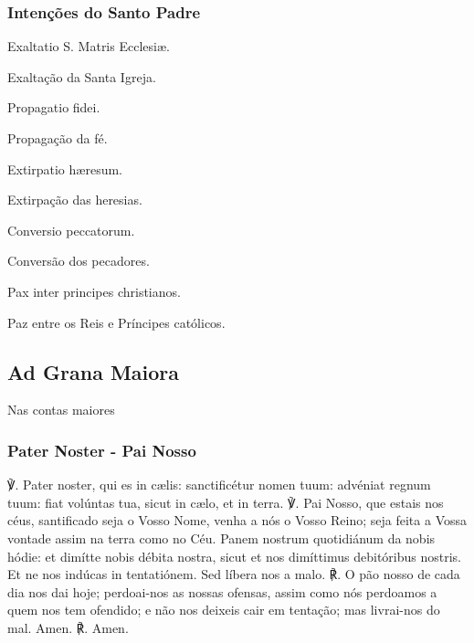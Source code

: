 \subsubsection{Intenções do Santo Padre}
\begin{paracol}{2}
\begin{compactitem}
\item Exaltatio S. Matris Ecclesiæ.
\switchcolumn
\item Exaltação da Santa Igreja.
\switchcolumn*
\item Propagatio fidei.
\switchcolumn
\item Propagação da fé.
\switchcolumn*
\item Extirpatio hæresum.
\switchcolumn
\item Extirpação das heresias.
\switchcolumn*
\item Conversio peccatorum.
\switchcolumn
\item Conversão dos pecadores.
\switchcolumn*
\item Pax inter principes christianos.
\switchcolumn
\item Paz entre os Reis e Príncipes católicos.
\end{compactitem}
\end{paracol}

\emph{}

\subsection{Ad Grana Maiora}
\begin{nscenter}Nas contas maiores\end{nscenter}
\subsubsection{Pater Noster - Pai Nosso}
\begin{paracol}{2}
{\redx ℣.} Pater noster, qui es in cælis: sanctificétur nomen tuum: advéniat regnum tuum: fiat volúntas tua, sicut in cælo, et in terra.
\switchcolumn
{\redx ℣.} Pai Nosso, que estais nos céus, santificado seja o Vosso Nome, venha a nós o Vosso Reino; seja feita a Vossa vontade assim na terra como no Céu.
 Panem nostrum quotidiánum da nobis hódie: et dimítte nobis débita nostra, sicut et nos dimíttimus debitóribus nostris. Et ne nos indúcas in tentatiónem. Sed líbera nos a malo.
\switchcolumn
{\redx ℟.} O pão nosso de cada dia nos dai hoje; perdoai-nos as nossas ofensas, assim como nós perdoamos a quem nos tem ofendido; e não nos deixeis cair em tentação; mas livrai-nos do mal.
 Amen.
\switchcolumn
{\redx ℟.} Amen.
\end{paracol}

